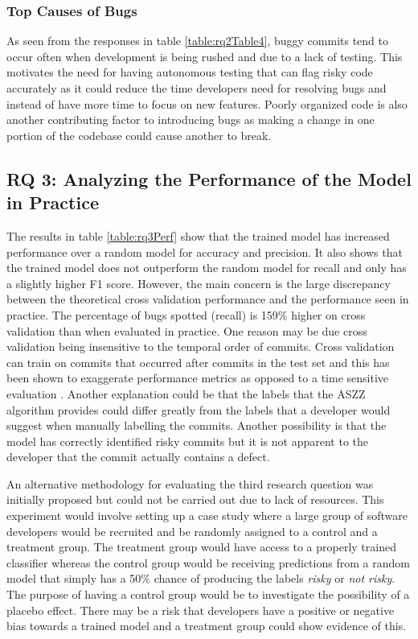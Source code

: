 \documentclass[../main.tex]{subfiles}
\begin{document}
\subsubsection{Top Causes of Bugs}

As seen from the responses in table \ref{table:rq2Table4}, buggy commits tend to occur often when development is being rushed and due to a lack of testing. This motivates the need for having autonomous testing that can flag risky code accurately as it could reduce the time developers need for resolving bugs and instead of have more time to focus on new features. Poorly organized code is also another contributing factor to introducing bugs as making a change in one portion of the codebase could cause another to break. 

\subsection{RQ 3: Analyzing the Performance of the Model in Practice}

The results in table \ref{table:rq3Perf} show that the trained model has increased performance over a random model for accuracy and precision. It also shows that the trained model does not outperform the random model for recall and only has a slightly higher F1 score. However, the main concern is the large discrepancy between the theoretical cross validation performance and the performance seen in practice. The percentage of bugs spotted (recall) is 159\% higher on cross validation than when evaluated in practice. One reason may be due cross validation being insensitive to the temporal order of commits. Cross validation can train on commits that occurred after commits in the test set and this has been shown to exaggerate performance metrics as opposed to a time sensitive evaluation \cite{tan2015online}. Another explanation could be that the labels that the ASZZ algorithm provides could differ greatly from the labels that a developer would suggest when manually labelling the commits. Another possibility is that the model has correctly identified risky commits but it is not apparent to the developer that the commit actually contains a defect. 

An alternative methodology for evaluating the third research question was initially proposed but could not be carried out due to lack of resources. This experiment would involve setting up a case study where a large group of software developers would be recruited and be randomly assigned to a control and a treatment group. The treatment group would have access to a properly trained classifier whereas the control group would be receiving predictions from a random model that simply has a 50\% chance of producing the labels \textit{risky} or \textit{not risky}. The purpose of having a control group would be to investigate the possibility of a placebo effect. There may be a risk that developers have a positive or negative bias towards a trained model and a treatment group could show evidence of this. 
\end{document}
